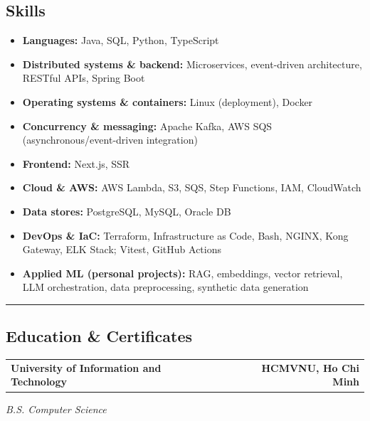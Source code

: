 \documentclass[10pt,letterpaper]{article}
\makeatletter
\newcommand{\headerrow}[2]
{\begin{tabular*}{\linewidth}{l@{\extracolsep{\fill}}r}
#1 &
#2 \\
\end{tabular*}}
\newcommand{\resumesectionrule}{%
  \par\vspace{0.18em}%
  \noindent\rule{\linewidth}{0.4pt}\par
  \vspace{0.24em}%
}
\makeatother
\begin{document}
\subsection*{\Large Skills}
\begin{itemize}
      \item \textbf{Languages:}
            Java, SQL, Python, TypeScript
      \item \textbf{Distributed systems \& backend:}
            Microservices, event-driven architecture, RESTful APIs, Spring Boot
      \item \textbf{Operating systems \& containers:}
            Linux (deployment), Docker
      \item \textbf{Concurrency \& messaging:}
            Apache Kafka, AWS SQS (asynchronous/event-driven integration)
      \item \textbf{Frontend:}
            Next.js, SSR
      \item \textbf{Cloud \& AWS:}
            AWS Lambda, S3, SQS, Step Functions, IAM, CloudWatch
      \item \textbf{Data stores:}
            PostgreSQL, MySQL, Oracle DB
      \item \textbf{DevOps \& IaC:}
            Terraform, Infrastructure as Code, Bash, NGINX, Kong Gateway, ELK Stack; Vitest, GitHub Actions
      \item \textbf{Applied ML (personal projects):}
            RAG, embeddings, vector retrieval, LLM orchestration, data preprocessing, synthetic data generation
\end{itemize}
\resumesectionrule
\subsection*{\Large Education \& Certificates}
\headerrow
{\textbf{University of Information and Technology}}
{\textbf{HCMVNU, Ho Chi Minh}}
\emph{B.S. Computer Science}
\vspace{0.35em}
\par{}
\end{document}
